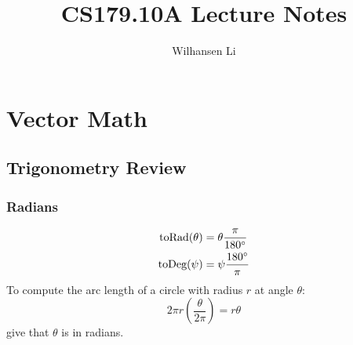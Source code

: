 \documentclass[12pt]{report}
\title{CS179.10A Lecture Notes}
\author{Wilhansen Li}
\begin{document}
\maketitle
\tableofcontents
	
\chapter{Vector Math}
\section{Trigonometry Review}
\subsection{Radians}
\begin{align*}
	\text{toRad}(\theta) & = \theta \frac{\pi}{180\degree} \\
	\text{toDeg}(\psi)   & = \psi\frac{180\degree}{\pi}    
\end{align*}
To compute the arc length of a circle with radius $r$ at angle $\theta$:
$$
2\pi r \left(\frac{\theta}{2\pi}\right) = r\theta
$$
give that $\theta$ is in radians.
\end{document}
